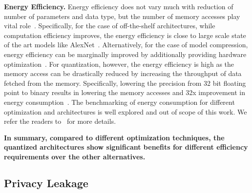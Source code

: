 \noindent\textbf{Energy Efficiency.} Energy efficiency does not vary much with reduction of number of parameters and data type, but the number of memory accesses play vital role~\cite{6757323}.
Specifically, for the case of off-the-shelf architectures, while computation efficiency improves, the energy efficiency is close to large scale state of the art models like AlexNet~\cite{DBLP:journals/corr/IandolaMAHDK16,8114708}.
Alternatively, for the case of model compression, energy efficiency can be marginally improved by additionally providing hardware optimization~\cite{journals/corr/YangCS16a,DBLP:journals/corr/HanMD15}.
For quantization, however, the energy efficiency is high as the memory access can be drastically reduced by increasing the throughput of data fetched from the memory.
Specifically, lowering the precision from 32 bit floating point to binary results in lowering the memory accesses and 32x improvement in energy consumption~\cite{NIPS2016_6573,rastegari2016xnornet}.
The benchmarking of energy consumption for different optimization and architectures is well explored and out of scope of this work. We refer the readers to~\cite{8114708} for more details. %

\textbf{In summary, compared to different optimization techniques, the quantized architectures show significant benefits for different efficiency requirements over the other alternatives.}






\subsection{Privacy Leakage}\label{eval-leakage}

